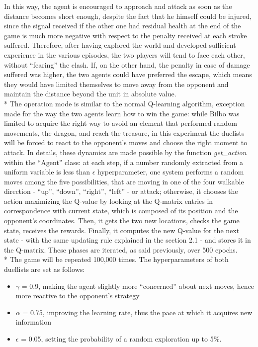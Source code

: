 In this way, the agent is encouraged to approach and attack as soon as the distance becomes short enough, despite the fact that he himself could be injured, since the signal received if the other one had residual health at the end of the game is much more negative with respect to the penalty received at each stroke suffered. Therefore, after having explored the world and developed sufficient experience in the various episodes, the two players will tend to face each other, without ``fearing'' the clash. If, on the other hand, the penalty in case of damage suffered was higher, the two agents could have preferred the escape, which means they would have limited themselves to move away from the opponent and maintain the distance beyond the unit in absolute value.\\*
The operation mode is similar to the normal Q-learning algorithm, exception made for the way the two agents learn how to win the game: while Bilbo was limited to acquire the right way to avoid an element that performed random movements, the dragon, and reach the treasure, in this experiment the duelists will be forced to react to the opponent's moves and choose the right moment to attack. In details, these dynamics are made possible by the function \textit{get\_action} within the ``Agent'' class:  at each step, if a number randomly extracted from a uniform variable is less than $\epsilon$ hyperparameter, one system performs a random moves among the five possibilities, that are moving in one of the four walkable direction - ``up'', ``down'', ``right'', ``left'' - or attack; otherwise, it chooses the action maximizing the Q-value by looking at the Q-matrix entries in correspondence with current state, which is composed of its position and the opponent's coordinates. Then, it gets the two new locations, checks the game state, receives the rewards. Finally, it computes the new Q-value for the next state - with the same updating rule explained in the section 2.1 - and stores it in the Q-matrix. These phases are iterated, as said previously, over 500 epochs.\\*
The game will be repeated 100,000 times. The hyperparameters of both duellists are set as follows:
\begin{itemize}[noitemsep, topsep=0ex]
  \item $\gamma$ = 0.9, making the agent slightly more ``concerned'' about next moves, hence more reactive to the opponent's strategy
  \item $\alpha$ = 0.75, improving the learning rate, thus the pace at which it acquires new information
  \item $\epsilon$ = 0.05, setting the probability of a random exploration up to 5\%.
\end{itemize} 

